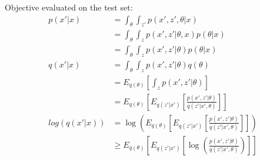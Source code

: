 \documentclass{article}
\begin{document}
Objective evaluated on the test set:
\begin{align}
    p(x'|x) &= \int_{\theta} \int_{z'} p(x',z',\theta|x) \\
    &= \int_{\theta} \int_{z} p(x',z'|\theta,x) p(\theta|x) \\
    &= \int_{\theta} \int_{z} p(x',z'|\theta) p(\theta|x) \\
    q(x'|x) &= \int_{\theta} \int_{z} p(x',z'|\theta) q(\theta) \\
    &= E_{q(\theta)} \left[ \int_{z} p(x',z'|\theta) \right] \\
    &= E_{q(\theta)} \left[ E_{q(z'|x')} \left[ \frac{p(x',z'|\theta)}{q(z'|x',\theta)} \right] \right]  \\
	log(q(x'|x)) &=\log \left(  E_{q(\theta)} \left[ E_{q(z'|x')} \left[ \frac{p(x',z'|\theta)}{q(z'|x',\theta)}  \right ] \right ] \right) \\
    &\geq   E_{q(\theta)} \left[ E_{q(z'|x')} \left[\log \left( \frac{p(x',z'|\theta)}{q(z'|x',\theta)} \right) \right ] \right ] 
\end{align}




\end{document}
